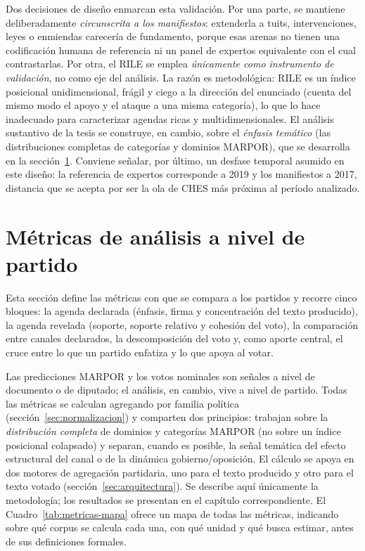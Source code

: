 Dos decisiones de diseño enmarcan esta validación. Por una parte, se mantiene
deliberadamente \emph{circunscrita a los manifiestos}: extenderla a tuits,
intervenciones, leyes o enmiendas carecería de fundamento, porque esas arenas no
tienen una codificación humana de referencia ni un panel de expertos
equivalente con el cual contrastarlas. Por otra, el RILE se emplea
\emph{únicamente como instrumento de validación}, no como eje del análisis. La
razón es metodológica: RILE es un índice posicional unidimensional, frágil y
ciego a la dirección del enunciado (cuenta del mismo modo el apoyo y el ataque
a una misma categoría), lo que lo hace inadecuado para caracterizar agendas
ricas y multidimensionales. El análisis sustantivo de la tesis se construye, en
cambio, sobre el \emph{énfasis temático} (las distribuciones completas de
categorías y dominios MARPOR), que se desarrolla en la
sección~\ref{sec:metricas}. Conviene señalar, por último, un desfase temporal
asumido en este diseño: la referencia de expertos corresponde a 2019 y los
manifiestos a 2017, distancia que se acepta por ser la ola de CHES más próxima al
período analizado.

\section{Métricas de análisis a nivel de partido}
\label{sec:metricas}

Esta sección define las métricas con que se compara a los partidos y recorre
cinco bloques: la agenda declarada (énfasis, firma y concentración del texto
producido), la agenda revelada (soporte, soporte relativo y cohesión del voto),
la comparación entre canales declarados, la descomposición del voto y, como
aporte central, el cruce entre lo que un partido enfatiza y lo que apoya al
votar.

Las predicciones MARPOR y los votos nominales son señales a nivel de documento o
de diputado; el análisis, en cambio, vive a nivel de partido. Todas las métricas
se calculan agregando por familia política (sección~\ref{sec:normalizacion}) y
comparten dos principios: trabajan sobre la \emph{distribución completa} de
dominios y categorías MARPOR (no sobre un índice posicional colapsado) y
separan, cuando es posible, la señal temática del efecto estructural del canal o
de la dinámica gobierno/oposición. El cálculo se apoya en dos motores de
agregación partidaria, uno para el texto producido y otro para el texto votado
(sección~\ref{sec:arquitectura}). Se describe aquí únicamente la metodología; los
resultados se presentan en el capítulo correspondiente. El
Cuadro~\ref{tab:metricas-mapa} ofrece un mapa de todas las métricas, indicando
sobre qué corpus se calcula cada una, con qué unidad y qué busca estimar, antes de
sus definiciones formales.

